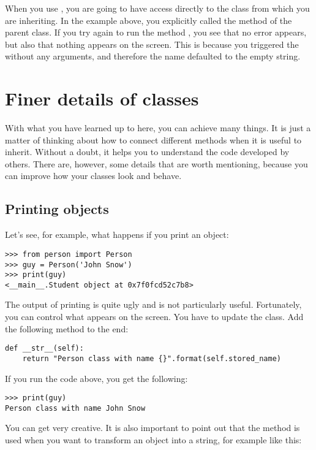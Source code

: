 When you use , you are going to have access directly to the class from which you are inheriting. In the example above, you explicitly called the  method of the parent class. If you try again to run the method , you see that no error appears, but also that nothing appears on the screen. This is because you triggered the  without any arguments, and therefore the name defaulted to the empty string.


\section{Finer details of classes}
With what you have learned up to here, you can achieve many things. It is just a matter of thinking about how to connect different methods when it is useful to inherit. Without a doubt, it helps you to understand the code developed by others. There are, however, some details that are worth mentioning, because you can improve how your classes look and behave.

\subsection{Printing objects}
Let's see, for example, what happens if you print an object:
\begin{verbatim}
>>> from person import Person
>>> guy = Person('John Snow')
>>> print(guy)
<__main__.Student object at 0x7f0fcd52c7b8>
\end{verbatim}
The output of printing  is quite ugly and is not particularly useful. Fortunately, you can control what appears on the screen. You have to update the  class. Add the following method to the end:

\begin{verbatim}
def __str__(self):
    return "Person class with name {}".format(self.stored_name)
\end{verbatim}

If you run the code above, you get the following:
\begin{verbatim}
>>> print(guy)
Person class with name John Snow
\end{verbatim}

You can get very creative. It is also important to point out that the method  is used when you want to transform an object into a string, for example like this:

